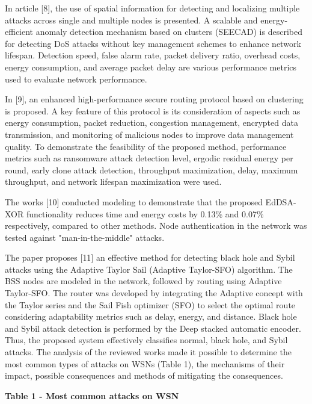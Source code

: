 In article {[}8{]}, the use of spatial information for detecting and
localizing multiple attacks across single and multiple nodes is
presented. A scalable and energy-efficient anomaly detection mechanism
based on clusters (SEECAD) is described for detecting DoS attacks
without key management schemes to enhance network lifespan. Detection
speed, false alarm rate, packet delivery ratio, overhead costs, energy
consumption, and average packet delay are various performance metrics
used to evaluate network performance.

In {[}9{]}, an enhanced high-performance secure routing protocol based
on clustering is proposed. A key feature of this protocol is its
consideration of aspects such as energy consumption, packet reduction,
congestion management, encrypted data transmission, and monitoring of
malicious nodes to improve data management quality. To demonstrate the
feasibility of the proposed method, performance metrics such as
ransomware attack detection level, ergodic residual energy per round,
early clone attack detection, throughput maximization, delay, maximum
throughput, and network lifespan maximization were used.

The works {[}10{]} conducted modeling to demonstrate that the proposed
EdDSA-XOR functionality reduces time and energy costs by 0.13\% and
0.07\% respectively, compared to other methods. Node authentication in
the network was tested against "man-in-the-middle" attacks.

The paper proposes {[}11{]} an effective method for detecting black hole
and Sybil attacks using the Adaptive Taylor Sail (Adaptive Taylor-SFO)
algorithm. The BSS nodes are modeled in the network, followed by routing
using Adaptive Taylor-SFO. The router was developed by integrating the
Adaptive concept with the Taylor series and the Sail Fish optimizer
(SFO) to select the optimal route considering adaptability metrics such
as delay, energy, and distance. Black hole and Sybil attack detection is
performed by the Deep stacked automatic encoder. Thus, the proposed
system effectively classifies normal, black hole, and Sybil attacks. The
analysis of the reviewed works made it possible to determine the most
common types of attacks on WSNs (Table 1), the mechanisms of their
impact, possible consequences and methods of mitigating the
consequences.

{\bfseries Table 1 - Most common attacks on WSN}

